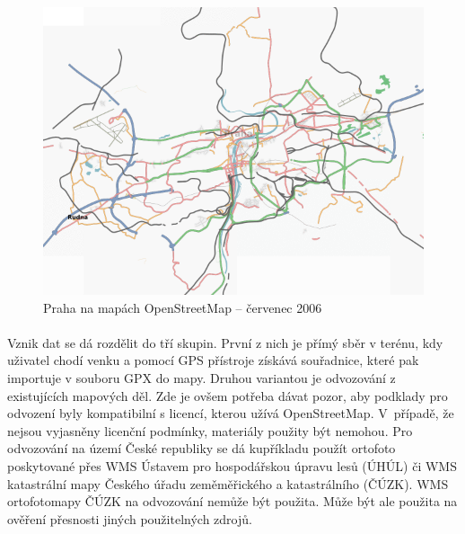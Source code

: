 \documentclass[11pt,a4paper,titlepage,oneside]{book}
\begin{document}
		\begin{figure}[!h]
			\begin{center}
				\includegraphics[width=12cm]{obrazky/Osm-200607-praha.png}
				\caption{Praha na mapách OpenStreetMap -- červenec 2006}
				\label{fig:praha2006}
			\end{center}
		\end{figure}





		\paragraph{} Vznik dat se dá rozdělit do tří skupin. První z nich je přímý sběr v terénu, kdy uživatel chodí venku a pomocí GPS přístroje získává souřadnice, které pak importuje v souboru GPX do mapy. Druhou variantou je odvozování z existujících mapových děl. Zde je ovšem potřeba dávat pozor, aby podklady pro odvození  byly kompatibilní s licencí, kterou užívá OpenStreetMap. V~případě, že nejsou vyjasněny licenční podmínky, materiály použity být nemohou. Pro odvozování na území České republiky se dá kupříkladu použít ortofoto poskytované přes WMS Ústavem pro hospodářskou úpravu lesů (ÚHÚL) či WMS katastrální mapy Českého úřadu zeměměřického a katastrálního (ČÚZK). WMS ortofotomapy ČÚZK na odvozování nemůže být použita. Může být ale použita na ověření přesnosti jiných použitelných zdrojů.
\end{document}

